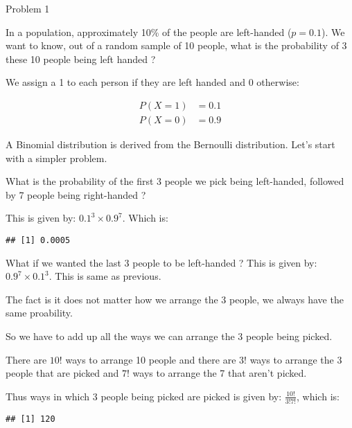 \documentclass[ignorenonframetext,aspectratio=169]{beamer}
\begin{document}
\begin{frame}{Problem 1}
\protect\hypertarget{problem-1-1}{}

In a population, approximately 10\% of the people are left-handed
(\(p = 0.1\)). We want to know, out of a random sample of 10 people,
what is the probability of 3 these 10 people being left handed ?

We assign a 1 to each person if they are left handed and 0 otherwise:

\[
\begin{aligned}
P(X = 1) &= 0.1 \\
P(X = 0) &= 0.9
\end{aligned}
\]

\end{frame}

\begin{frame}[fragile]{}
\protect\hypertarget{section-4}{}

A Binomial distribution is derived from the Bernoulli distribution.
Let's start with a simpler problem.

What is the probability of the first 3 people we pick being left-handed,
followed by 7 people being right-handed ?

This is given by: \(0.1^3 \times 0.9^7\). Which is:

\begin{verbatim}
## [1] 0.0005
\end{verbatim}

What if we wanted the last 3 people to be left-handed ? This is given
by: \(0.9^7 \times 0.1^3\). This is same as previous.

\end{frame}

\begin{frame}[fragile]{}
\protect\hypertarget{section-5}{}

The fact is it does not matter how we arrange the 3 people, we always
have the same proability.

So we have to add up all the ways we can arrange the 3 people being
picked.

There are \(10!\) ways to arrange 10 people and there are \(3!\) ways to
arrange the 3 people that are picked and \(7!\) ways to arrange the 7
that aren't picked.

Thus ways in which 3 people being picked are picked is given by:
\(\frac{10!}{3!7!}\), which is:

\begin{verbatim}
## [1] 120
\end{verbatim}

\end{frame}
\end{document}
